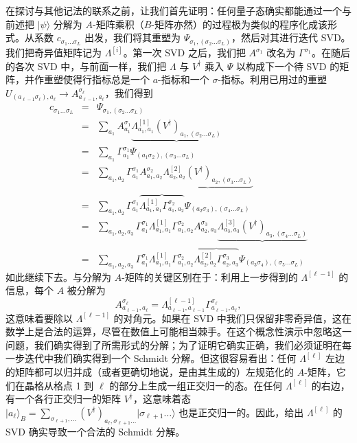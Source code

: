 \documentclass[a4paper,10pt,oneside,onecolumn,1p,times]{elsarticle}
\newcommand{\ket}[1]{\mbox{$| #1  \rangle$}}
\begin{document}
在探讨与其他记法的联系之前，让我们首先证明：任何量子态确实都能通过一个与前述把 $\ket{\psi}$ 分解为 $A$-矩阵乘积（$B$-矩阵亦然）的过程极为类似的程序化成该形式。从系数 $c_{\sigma_1\ldots\sigma_L}$ 出发，我们将其重塑为 $\Psi_{\sigma_1, (\sigma_2 \ldots \sigma_L)}$，然后对其进行迭代 SVD。我们把奇异值矩阵记为 $\Lambda^{[i]}$。第一次 SVD 之后，我们把 $A^{\sigma_1}$ 改名为 $\Gamma^{\sigma_1}$。在随后的各次 SVD 中，与前面一样，我们把 $\Lambda$ 与 $V^\dagger$ 乘入 $\Psi$ 以构成下一个待 SVD 的矩阵，并作重塑使得行指标总是一个 $a$-指标和一个 $\sigma$-指标。利用已用过的重塑 $U_{(a_{\ell-1}\sigma_\ell), a_{\ell}} \rightarrow A^{\sigma_\ell}_{a_{\ell-1},a_\ell}$，我们得到
\begin{eqnarray*}
c_{\sigma_1\ldots\sigma_L} &=& \Psi_{\sigma_1, (\sigma_2 \ldots \sigma_L)} \\
&=& \sum_{a_1} A^{\sigma_1}_{a_1} \underbrace{\Lambda^{[1]}_{a_1,a_1} (V^\dagger)_{a_1, (\sigma_2 \ldots \sigma_L)}} \\
&=& \sum_{a_1} \Gamma^{\sigma_1}_{a_1} \Psi_{(a_1\sigma_2), (\sigma_3 \ldots \sigma_L)} \\
&=& \sum_{a_1,a_2} \Gamma^{\sigma_1}_{a_1} A^{\sigma_2}_{a_1,a_2} \underbrace{\Lambda^{[2]}_{a_2,a_2} (V^\dagger)_{a_2, (\sigma_3 \ldots \sigma_L)}} \\
&=& \sum_{a_1,a_2} \Gamma^{\sigma_1}_{a_1} \overbrace{\Lambda^{[1]}_{a_1,a_1} \Gamma^{\sigma_2}_{a_1,a_2}} \Psi_{(a_2\sigma_3), (\sigma_4 \ldots \sigma_L)} \\
&=& \sum_{a_1,a_2,a_3} \Gamma^{\sigma_1}_{a_1} \Lambda^{[1]}_{a_1,a_1} \Gamma^{\sigma_2}_{a_1,a_2} A^{\sigma_3}_{a_2,a_3}  \underbrace{\Lambda^{[3]}_{a_3,a_3} (V^\dagger)_{a_3, (\sigma_4 \ldots \sigma_L)}} \\ 
&=& \sum_{a_1,a_2,a_3} \Gamma^{\sigma_1}_{a_1} \Lambda^{[1]}_{a_1,a_1} \Gamma^{\sigma_2}_{a_1,a_2} \overbrace{\Lambda^{[2]}_{a_2,a_2} \Gamma^{\sigma_3}_{a_2,a_3}}  \Psi_{(a_3\sigma_4), (\sigma_5 \ldots \sigma_L)} 
\end{eqnarray*}
如此继续下去。与分解为 $A$-矩阵的关键区别在于：利用上一步得到的 $\Lambda^{[\ell-1]}$ 的信息，每个 $A$ 被分解为 
\begin{equation}
A^{\sigma_\ell}_{a_{\ell-1},a_\ell} = \Lambda^{[\ell-1]}_{a_{\ell-1},a_{\ell-1}} \Gamma^{\sigma_\ell}_{a_{\ell-1},a_\ell} ,
\label{eq:agammalambda}
\end{equation}
这意味着要除以 $\Lambda^{[\ell-1]}$ 的对角元。如果在 SVD 中我们只保留非零奇异值，这在数学上是合法的运算，尽管在数值上可能相当棘手。在这个概念性演示中忽略这一问题，我们确实得到了所需形式的分解；为了证明它确实正确，我们必须证明在每一步迭代中我们确实得到一个 Schmidt 分解。但这很容易看出：任何 $\Lambda^{[\ell]}$ 左边的矩阵都可以归并成（或者更确切地说，是由其生成的）左规范化的 $A$-矩阵，它们在晶格从格点 1 到 $\ell$ 的部分上生成一组正交归一的态。在任何 $\Lambda^{[\ell]}$ 的右边，有一个各行正交归一的矩阵 $V^\dagger$，这意味着态 $\ket{a_\ell}_B = \sum_{\sigma_{\ell+1},\ldots}
(V^\dagger)_{a_\ell, \sigma_{\ell+1} \ldots} \ket{\sigma_{\ell+1} \ldots}$ 也是正交归一的。因此，给出 $\Lambda^{[\ell]}$ 的 SVD 确实导致一个合法的 Schmidt 分解。
\end{document}
